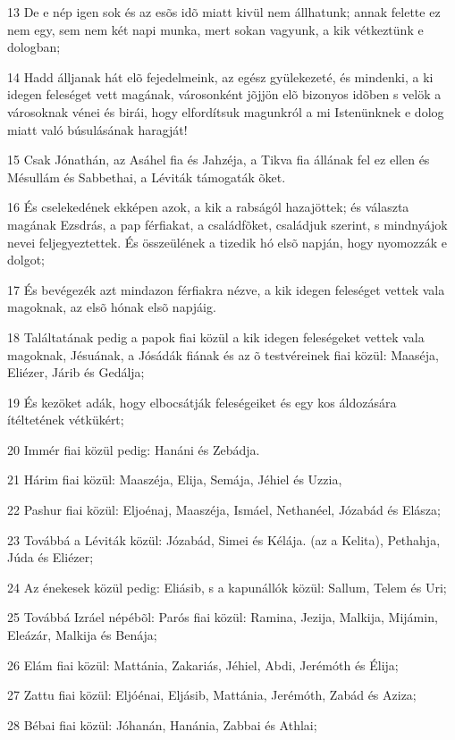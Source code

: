 {\par 13 De e nép igen sok és az esõs idõ miatt kivül nem állhatunk; annak felette ez nem egy, sem nem két napi munka, mert sokan vagyunk, a kik vétkeztünk e dologban;
\par 14 Hadd álljanak hát elõ fejedelmeink, az egész gyülekezeté, és mindenki, a ki idegen feleséget vett magának, városonként jõjjön elõ bizonyos idõben s velök a városoknak vénei és birái, hogy elfordítsuk magunkról a mi Istenünknek e dolog miatt való búsulásának haragját!
\par 15 Csak Jónathán, az Asáhel fia és Jahzéja, a Tikva fia állának fel ez ellen és Mésullám és Sabbethai, a Léviták támogaták õket.
\par 16 És cselekedének ekképen azok, a kik a rabságól hazajöttek; és választa magának Ezsdrás, a pap férfiakat, a családfõket, családjuk szerint, s mindnyájok nevei feljegyeztettek. És összeülének a tizedik hó elsõ napján, hogy nyomozzák e dolgot;
\par 17 És bevégezék azt mindazon férfiakra nézve, a kik idegen feleséget vettek vala magoknak, az elsõ hónak elsõ napjáig.
\par 18 Találtatának pedig a papok fiai közül a kik idegen feleségeket vettek vala magoknak, Jésuának, a Jósádák fiának és az õ testvéreinek fiai közül: Maaséja, Eliézer, Járib és Gedálja;
\par 19 És kezöket adák, hogy elbocsátják feleségeiket és egy kos áldozására ítéltetének vétkükért;
\par 20 Immér fiai közül pedig: Hanáni és Zebádja.
\par 21 Hárim fiai közül: Maaszéja, Elija, Semája, Jéhiel és Uzzia,
\par 22 Pashur fiai közül: Eljoénaj, Maaszéja, Ismáel, Nethanéel, Józabád és Elásza;
\par 23 Továbbá a Léviták közül: Józabád, Simei és Kélája. (az a Kelita), Pethahja, Júda és Eliézer;
\par 24 Az énekesek közül pedig: Eliásib, s a kapunállók közül: Sallum, Telem és Uri;
\par 25 Továbbá Izráel népébõl: Parós fiai közül: Ramina, Jezija, Malkija, Mijámin, Eleázár, Malkija és Benája;
\par 26 Elám fiai közül: Mattánia, Zakariás, Jéhiel, Abdi, Jerémóth és Élija;
\par 27 Zattu fiai közül: Eljóénai, Eljásib, Mattánia, Jerémóth, Zabád és Aziza;
\par 28 Bébai fiai közül: Jóhanán, Hanánia, Zabbai és Athlai;
}
